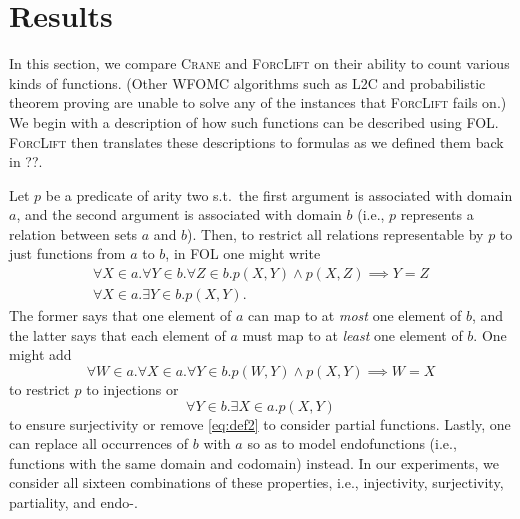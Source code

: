 \section{Results}\label{sec:results} %

In this section, we compare \textsc{Crane} and \textsc{ForcLift}
\citep{DBLP:conf/ijcai/BroeckTMDR11} on their ability to count various kinds of
functions. (Other WFOMC algorithms such as \textsc{L2C}
\citep{DBLP:conf/kr/KazemiP16} and probabilistic theorem proving
\citep{DBLP:journals/cacm/GogateD16} are unable to solve any of the instances
that \textsc{ForcLift} fails on.) We begin with a description of how such
functions can be described using FOL\@. \textsc{ForcLift} then translates these
descriptions to formulas as we defined them back in ??.

Let $p$ be a predicate of arity two s.t.\ the first argument is associated with
domain $a$, and the second argument is associated with domain $b$ (i.e., $p$
represents a relation between sets $a$ and $b$). Then, to restrict all relations
representable by $p$ to just functions from $a$ to $b$, in FOL one
might write
\begin{gather}
  \forall X \in a. \forall Y \in b. \forall Z \in b. p(X, Y) \land p(X, Z) \implies Y = Z \label{eq:def1} \\
  \forall X \in a. \exists Y \in b. p(X, Y). \label{eq:def2}
\end{gather}
The former says that one element of $a$ can map to at \emph{most} one element of
$b$, and the latter says that each element of $a$ must map to at \emph{least}
one element of $b$. One might add
\begin{equation} \label{eq:injectivity}
  \forall W \in a. \forall X \in a. \forall Y \in b. p(W, Y) \land p(X, Y) \implies W = X
\end{equation}
to restrict $p$ to injections or
\begin{equation}
  \forall Y \in b. \exists X \in a. p(X, Y)
\end{equation}
to ensure surjectivity or remove \cref{eq:def2} to consider partial functions.
Lastly, one can replace all occurrences of $b$ with $a$ so as to model
endofunctions (i.e., functions with the same domain and codomain) instead. In
our experiments, we consider all sixteen combinations of these properties, i.e.,
injectivity, surjectivity, partiality, and endo-.

